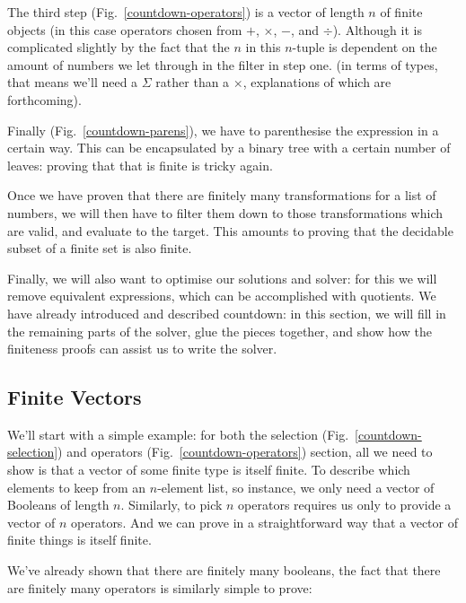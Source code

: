 The third step (Fig.~\ref{countdown-operators}) is a vector of length \(n\) of finite objects (in this case operators
chosen from \(+\), \(\times\), \(-\), and \(\div\)).
Although it is complicated slightly by the fact that the \(n\) in this
\(n\)-tuple is dependent on the amount of numbers we let through in the filter
in step one.
(in terms of types, that means we'll need a \(\Sigma\) rather than a
\(\times\), explanations of which are forthcoming).

Finally (Fig.~\ref{countdown-parens}), we have to parenthesise the expression in
a certain way.
This can be encapsulated by a binary tree with a certain number of leaves:
proving that that is finite is tricky again.

Once we have proven that there are finitely many transformations for a list of
numbers, we will then have to filter them down to those transformations which
are valid, and evaluate to the target.
This amounts to proving that the decidable subset of a finite set is also
finite.

Finally, we will also want to optimise our solutions and solver: for this we
will remove equivalent expressions, which can be accomplished with quotients.
We have already introduced and described countdown: in this section, we will
fill in the remaining parts of the solver, glue the pieces together, and show
how the finiteness proofs can assist us to write the solver.
\subsection{Finite Vectors}
We'll start with a simple example: for both the selection
(Fig.~\ref{countdown-selection}) and operators (Fig.~\ref{countdown-operators})
section, all we need to show is that a vector of some finite type is itself
finite.
To describe which elements to keep from an \(n\)-element list, so instance, we
only need a vector of Booleans of length \(n\).
Similarly, to pick \(n\) operators requires us only to provide a vector of \(n\)
operators.
And we can prove in a straightforward way that a vector of finite things is
itself finite.
\begin{agdalisting}
\end{agdalisting}
We've already shown that there are finitely many booleans, the fact that there
are finitely many operators is similarly simple to prove:
\begin{agdalisting}
\end{agdalisting}
